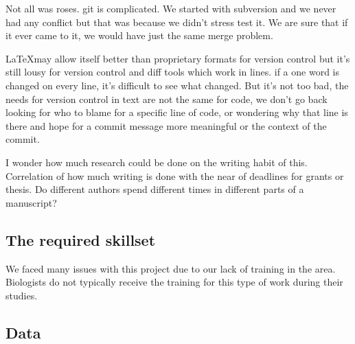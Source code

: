 Not all was roses.  git is complicated.  We started with subversion
and we never had any conflict but that was because we didn't stress
test it.  We are sure that if it ever came to it, we would have just
the same merge problem.

\LaTeX may allow itself better than proprietary formats for version
control but it's still lousy for version control and diff tools which
work in lines. if a one word is changed on every line, it's difficult
to see what changed.  But it's not too bad, the needs for version
control in text are not the same for code, we don't go back looking
for who to blame for a specific line of code, or wondering why that
line is there and hope for a commit message more meaningful or the
context of the commit.

I wonder how much research could be done on the writing habit of this.
Correlation of how much writing is done with the near of deadlines for
grants or thesis.  Do different authors spend different times in
different parts of a manuscript?





\subsection{The required skillset}

We faced many issues with this project due to our lack of training in
the area.  Biologists do not typically receive the training for this
type of work during their studies. 



\subsection{Data}


